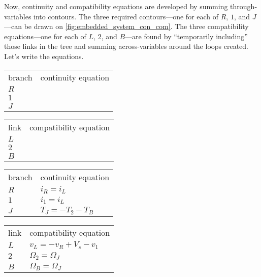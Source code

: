 \documentclass[dynamic_systems.tex]{subfiles}
\begin{document}
Now, continuity and compatibility equations are developed by summing through-variables into contours.
The three required contours---one for each of $R$, $1$, and $J$---can be drawn on \autoref{fig:embedded_system_con_com}.
The three compatibility equations---one for each of $L$, $2$, and $B$---are found by ``temporarily including'' those links in the tree and summing across-variables around the loops created.
Let's write the equations.
\begin{center}
\begingroup
\renewcommand{\arraystretch}{2}
\ifdefined\ispartial
\begin{tabular}{l|l}
	branch & continuity equation \\
	$R$ & \phantom{$i_R = i_L$} \\
	$1$ & \phantom{$i_1 = i_L$} \\
	$J$ & \phantom{$T_J = -T_2 - T_B$}
\end{tabular}
\qquad\quad
\begin{tabular}{l|l}
	link & compatibility equation \\
	$L$ & \phantom{$v_L = -v_R+V_s-v_1$} \\
	$2$ & \phantom{$\Omega_2 = \Omega_J$} \\
	$B$ & \phantom{$\Omega_B = \Omega_J$}
\end{tabular}
\else
\begin{tabular}{l|l}
	branch & continuity equation \\
	$R$ & $i_R = i_L$ \\
	$1$ & $i_1 = i_L$ \\
	$J$ & $T_J = -T_2 - T_B$
\end{tabular}
\qquad\quad
\begin{tabular}{l|l}
	link & compatibility equation \\
	$L$ & $v_L = -v_R+V_s-v_1$ \\
	$2$ & $\Omega_2 = \Omega_J$ \\
	$B$ & $\Omega_B = \Omega_J$
\end{tabular}
\fi
\endgroup
\end{center}

\endgroup
\end{document}
